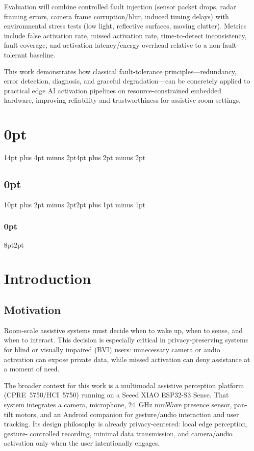 \documentclass[12pt]{extarticle}
\begin{document}
{Evaluation will combine controlled fault injection (sensor packet drops, radar framing
errors, camera frame corruption/blur, induced timing delays) with environmental stress
tests (low light, reflective surfaces, moving clutter).
Metrics include false activation rate, missed activation rate, time-to-detect
inconsistency, fault coverage, and activation latency/energy overhead relative to a
non-fault-tolerant baseline.

This work demonstrates how classical fault-tolerance principles---redundancy, error
detection, diagnosis, and graceful degradation---can be concretely applied to practical
edge AI activation pipelines on resource-constrained embedded hardware, improving
reliability and trustworthiness for assistive room settings.
}

\clearpage
\tableofcontents

\clearpage
\titlespacing\section{0pt}{14pt plus 4pt minus 2pt}{4pt plus 2pt minus 2pt}
\titlespacing\subsection{0pt}{10pt plus 2pt minus 2pt}{2pt plus 1pt minus 1pt}
\titlespacing\subsubsection{0pt}{8pt}{2pt}
\setlength{\parskip}{0.45\baselineskip}
\setlength{\parindent}{0pt}

\section{Introduction}
\label{sec:intro}

\subsection{Motivation}

Room-scale assistive systems must decide when to wake up, when to sense, and when to
interact.
This decision is especially critical in privacy-preserving systems for blind or visually
impaired (BVI) users: unnecessary camera or audio activation can expose private data,
while missed activation can deny assistance at a moment of need.

The broader context for this work is a multimodal assistive perception platform
(CPRE~5750/HCI~5750) running on a Seeed XIAO ESP32-S3 Sense.
That system integrates a camera, microphone, 24~GHz mmWave presence sensor, pan-tilt
motors, and an Android companion for gesture/audio interaction and user tracking.
Its design philosophy is already privacy-centered: local edge perception, gesture-
controlled recording, minimal data transmission, and camera/audio activation only when
the user intentionally engages.
\end{document}
